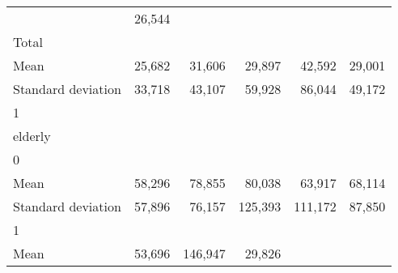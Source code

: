 \begin{tabular}{llllll}
  \multicolumn{1}{r}{} &
  \multicolumn{1}{r}{26,544} \\
\multicolumn{1}{l}{\hspace{3em}Total} &
  \multicolumn{1}{|r}{} &
  \multicolumn{1}{r}{} &
  \multicolumn{1}{r}{} &
  \multicolumn{1}{r}{} &
  \multicolumn{1}{r}{} \\
\multicolumn{1}{l}{\hspace{4em}Mean} &
  \multicolumn{1}{|r}{25,682} &
  \multicolumn{1}{r}{31,606} &
  \multicolumn{1}{r}{29,897} &
  \multicolumn{1}{r}{42,592} &
  \multicolumn{1}{r}{29,001} \\
\multicolumn{1}{l}{\hspace{4em}Standard deviation} &
  \multicolumn{1}{|r}{33,718} &
  \multicolumn{1}{r}{43,107} &
  \multicolumn{1}{r}{59,928} &
  \multicolumn{1}{r}{86,044} &
  \multicolumn{1}{r}{49,172} \\
\multicolumn{1}{l}{\hspace{1em}1} &
  \multicolumn{1}{|r}{} &
  \multicolumn{1}{r}{} &
  \multicolumn{1}{r}{} &
  \multicolumn{1}{r}{} &
  \multicolumn{1}{r}{} \\
\multicolumn{1}{l}{\hspace{2em}elderly} &
  \multicolumn{1}{|r}{} &
  \multicolumn{1}{r}{} &
  \multicolumn{1}{r}{} &
  \multicolumn{1}{r}{} &
  \multicolumn{1}{r}{} \\
\multicolumn{1}{l}{\hspace{3em}0} &
  \multicolumn{1}{|r}{} &
  \multicolumn{1}{r}{} &
  \multicolumn{1}{r}{} &
  \multicolumn{1}{r}{} &
  \multicolumn{1}{r}{} \\
\multicolumn{1}{l}{\hspace{4em}Mean} &
  \multicolumn{1}{|r}{58,296} &
  \multicolumn{1}{r}{78,855} &
  \multicolumn{1}{r}{80,038} &
  \multicolumn{1}{r}{63,917} &
  \multicolumn{1}{r}{68,114} \\
\multicolumn{1}{l}{\hspace{4em}Standard deviation} &
  \multicolumn{1}{|r}{57,896} &
  \multicolumn{1}{r}{76,157} &
  \multicolumn{1}{r}{125,393} &
  \multicolumn{1}{r}{111,172} &
  \multicolumn{1}{r}{87,850} \\
\multicolumn{1}{l}{\hspace{3em}1} &
  \multicolumn{1}{|r}{} &
  \multicolumn{1}{r}{} &
  \multicolumn{1}{r}{} &
  \multicolumn{1}{r}{} &
  \multicolumn{1}{r}{} \\
\multicolumn{1}{l}{\hspace{4em}Mean} &
  \multicolumn{1}{|r}{53,696} &
  \multicolumn{1}{r}{146,947} &
  \multicolumn{1}{r}{29,826} &

\end{tabular}
